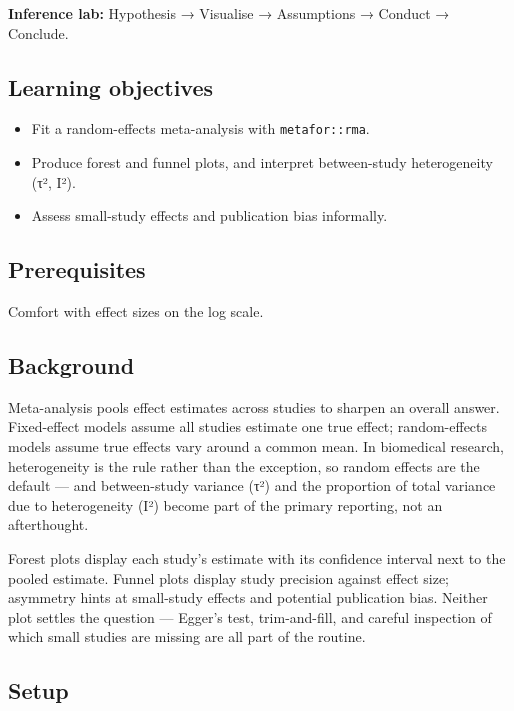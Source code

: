 \documentclass[
]{article}
\author{}
\date{\vspace{-2.5em}}
\providecommand{\tightlist}{%
  \setlength{\itemsep}{0pt}\setlength{\parskip}{0pt}}
\begin{document}
\textbf{Inference lab:} Hypothesis → Visualise → Assumptions → Conduct →
Conclude.

\subsection{Learning objectives}\label{learning-objectives}

\begin{itemize}
\tightlist
\item
  Fit a random-effects meta-analysis with \texttt{metafor::rma}.
\item
  Produce forest and funnel plots, and interpret between-study
  heterogeneity (τ², I²).
\item
  Assess small-study effects and publication bias informally.
\end{itemize}

\subsection{Prerequisites}\label{prerequisites}

Comfort with effect sizes on the log scale.

\subsection{Background}\label{background}

Meta-analysis pools effect estimates across studies to sharpen an
overall answer. Fixed-effect models assume all studies estimate one true
effect; random-effects models assume true effects vary around a common
mean. In biomedical research, heterogeneity is the rule rather than the
exception, so random effects are the default --- and between-study
variance (τ²) and the proportion of total variance due to heterogeneity
(I²) become part of the primary reporting, not an afterthought.

Forest plots display each study's estimate with its confidence interval
next to the pooled estimate. Funnel plots display study precision
against effect size; asymmetry hints at small-study effects and
potential publication bias. Neither plot settles the question ---
Egger's test, trim-and-fill, and careful inspection of which small
studies are missing are all part of the routine.

\subsection{Setup}\label{setup}
\end{document}

